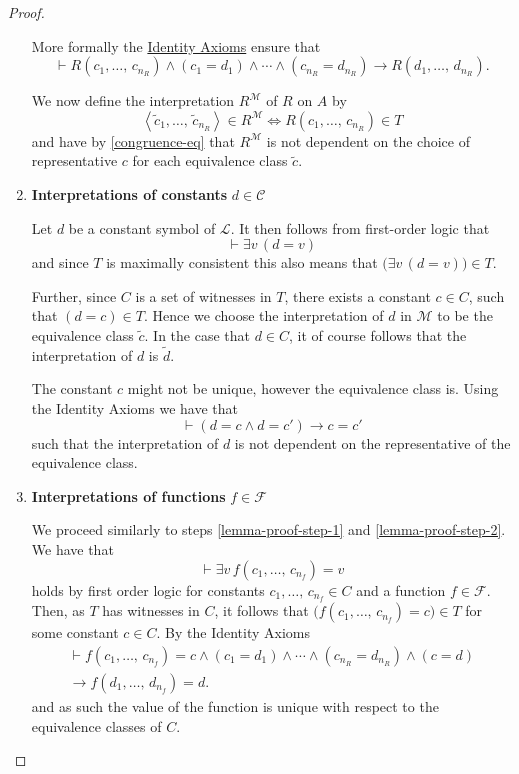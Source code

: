 \documentclass[../../main.tex]{subfiles}
\begin{document}
\begin{proof}
\begin{enumerate}
        More formally the \hyperref[identity-axioms]{Identity Axioms} ensure that
        $$\vdash R(c_1,\ldots,\,c_{n_R}) \wedge (c_1 = d_1) \wedge \cdots \wedge (c_{n_R} = d_{n_R}) \rightarrow R(d_1,\ldots,\,d_{n_R}).$$

        We now define the interpretation $R^\mathcal{M}$ of $R$ on $A$ by
        $$\left<\tilde{c}_1,\ldots,\,\tilde{c}_{n_R}\right> \in R^\mathcal{M} \iff R(c_1,\ldots,\,c_{n_R}) \in T$$
        and have by \eqref{congruence-eq} that $R^\mathcal{M}$ is not dependent on the choice of representative $c$ for each equivalence class $\tilde{c}$.

        \item \label{lemma-proof-step-2} \textbf{Interpretations of constants} $d \in \mathcal{C}$
        
        Let $d$ be a constant symbol of $\mathcal{L}$.
        It then follows from first-order logic that 
        $$\vdash \exists v \, (d = v)$$
        and since $T$ is maximally consistent this also means that $\big(\exists v \, (d = v)\big) \in T$.
        
        Further, since $C$ is a set of witnesses in $T$, there exists a constant $c \in C$, such that $(d = c) \in T$.
        Hence we choose the interpretation of $d$ in $\mathcal{M}$ to be the equivalence class $\tilde{c}$.
        In the case that $d \in C$, it of course follows that the interpretation of $d$ is $\tilde{d}$.

        The constant $c$ might not be unique, however the equivalence class is.
        Using the Identity Axioms we have that
        $$\vdash (d = c \wedge d = c') \rightarrow c = c'$$
        such that the interpretation of $d$ is not dependent on the representative of the equivalence class.

        \item \label{lemma-proof-step-3}\textbf{Interpretations of functions} $f \in \mathcal{F}$
        
        We proceed similarly to steps \ref{lemma-proof-step-1} and \ref{lemma-proof-step-2}.
        We have that
        $$\vdash \exists v\, f(c_1,\ldots,\, c_{n_f}) = v$$
        holds by first order logic for constants $c_1,\ldots,\, c_{n_f} \in C$ and a function $f \in \mathcal{F}$.
        Then, as $T$ has witnesses in $C$, it follows that $\big(f(c_1,\ldots,\, c_{n_f}) = c\big) \in T$ for some constant $c \in C$.
        By the Identity Axioms
        \begin{multline}\label{function-congruence-eq}
            \vdash f(c_1,\ldots,\,c_{n_f}) = c \wedge (c_1 = d_1) \wedge \cdots \wedge (c_{n_R} = d_{n_R}) \wedge (c = d) \\
            \rightarrow f(d_1,\ldots,\,d_{n_f})= d.
        \end{multline}
        and as such the value of the function is unique with respect to the equivalence classes of $C$.


\end{enumerate}
\end{proof}
\end{document}
